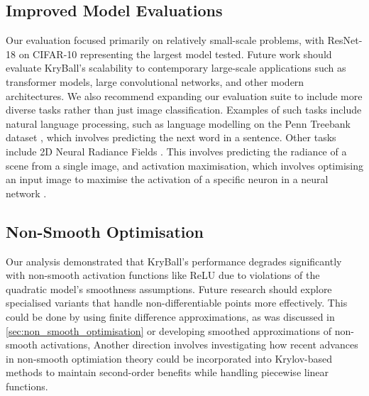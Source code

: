 \subsection{Improved Model Evaluations}
\label{ssec:improved_model_evaluations}

Our evaluation focused primarily on relatively small-scale problems, with ResNet-18 on CIFAR-10 representing the largest model tested. Future work should evaluate KryBall's scalability to contemporary large-scale applications such as transformer models, large convolutional networks, and other modern architectures. We also recommend expanding our evaluation suite to include more diverse tasks rather than just image classification. Examples of such tasks include natural language processing, such as language modelling on the Penn Treebank dataset \citep{penntreebank}, which involves predicting the next word in a sentence. Other tasks include 2D Neural Radiance Fields \citep{mildenhall2021nerf}. This involves predicting the radiance of a scene from a single image, and activation maximisation, which involves optimising an input image to maximise the activation of a specific neuron in a neural network \citep{activation_maximisation}.

\subsection{Non-Smooth Optimisation}
\label{ssec:non_smooth_optimisation_last}

Our analysis demonstrated that KryBall's performance degrades significantly with non-smooth activation functions like ReLU due to violations of the quadratic model's smoothness assumptions. Future research should explore specialised variants that handle non-differentiable points more effectively. This could be done by using finite difference approximations, as was discussed in \cref{sec:non_smooth_optimisation} or developing smoothed approximations of non-smooth activations, Another direction involves investigating how recent advances in non-smooth optimiation theory could be incorporated into Krylov-based methods to maintain second-order benefits while handling piecewise linear functions.


